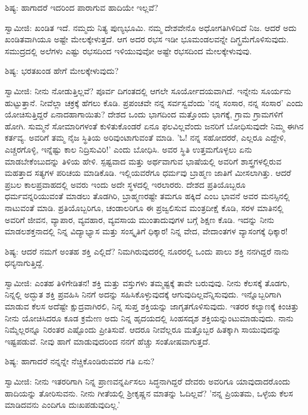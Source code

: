 ಶಿಷ್ಯ: ಹಾಗಾದರೆ ಇದರಿಂದ ಪಾರಾಗುವ ಹಾದಿಯೇ ಇಲ್ಲವೆ?

ಸ್ವಾಮೀಜಿ: ಖಂಡಿತ ಇದೆ. ನಮ್ಮದು ನಿತ್ಯ ಪುಣ್ಯಭೂಮಿ. ನಮ್ಮ ದೇಶವೇನೊ ಅಧೋಗತಿಗಿಳಿದಿದೆ ನಿಜ. ಆದರೆ ಅದು ಖಂಡಿತವಾಗಿಯೂ ಅಷ್ಟೇ ಮೇಲಕ್ಕೇಳುತ್ತದೆ. ಆಗ ಅದರ ರಭಸ ಇಡೀ ಭೂಮಂಡಲವನ್ನೇ ದಿಗ್ಭ್ರಮೆಗೊಳಿಸುವುದು. ಸಮುದ್ರದಲ್ಲಿ ಅಲೆಗಳು ಎಷ್ಟು ರಭಸದಿಂದ ಇಳಿಯುವುವೋ ಅಷ್ಟೇ ರಭಸದಿಂದ ಮೇಲಕ್ಕೇಳುವುವು.

ಶಿಷ್ಯ: ಭರತಖಂಡ ಹೇಗೆ ಮೇಲಕ್ಕೇಳುವುದು?

ಸ್ವಾಮೀಜಿ: ನೀನು ನೋಡುತ್ತಿಲ್ಲವೆ? ಪೂರ್ವ ದಿಗಂತದಲ್ಲಿ ಆಗಲೇ ಸೂರ್ಯೋದಯವಾಗಿದೆ. ಇನ್ನೇನು ಸೂರ್ಯನು ಹುಟ್ಟುತ್ತಾನೆ. ನೀವೆಲ್ಲಾ ಚಕ್ರಕ್ಕೆ ಹೆಗಲು ಕೊಡಿ. ಪ್ರಪಂಚವೇ ನನ್ನ ಸರ್ವಸ್ವವೆಂದು 'ನನ್ನ ಸಂಸಾರ, ನನ್ನ ಸಂಸಾರ' ಎಂದು ಯೋಚಿಸುತ್ತಿದ್ದರೆ ಏನಾದಹಾಗಾಯಿತು? ದೇಶದ ಒಂದು ಭಾಗದಿಂದ ಮತ್ತೊಂದು ಭಾಗಕ್ಕೆ, ಗ್ರಾಮ ಗ್ರಾಮಗಳಿಗೆ ಹೋಗಿ. ಸುಮ್ಮನೆ ಸೋಮಾರಿಗಳಂತೆ ಕುಳಿತುಕೊಂಡರೆ ಏನೂ ಫಲವಿಲ್ಲವೆಂದು ಜನರಿಗೆ ಬೋಧಿಸುವುದೇ ನಿಮ್ಮ ಈಗಿನ ಕರ್ತವ್ಯ. ಅವರಿಗೆ ತಮ್ಮ ನೈಜ ಸ್ಥಿತಿಯ ಅರಿವುಂಟಾಗುವಂತೆ ಮಾಡಿ. 'ಓ! ನನ್ನ ಸಹೋದರರೆ, ಎಲ್ಲರೂ ಎದ್ದೇಳಿ, ಎಚ್ಚರಗೊಳ್ಳಿ, ಇನ್ನೆಷ್ಟು ಕಾಲ ನಿದ್ರಿಸುವಿರಿ!' ಎಂದು ಬೋಧಿಸಿ. ಅವರ ಸ್ಥಿತಿ ಉತ್ತಮಗೊಳ್ಳಲು ಏನು ಮಾಡಬೇಕೆಂಬುದನ್ನು ತಿಳಿಯ ಹೇಳಿ. ಸ್ಪಷ್ಟವಾದ ಮತ್ತು ಅರ್ಥವಾಗುವ ಭಾಷೆಯಲ್ಲಿ ಅವರಿಗೆ ಶಾಸ್ತ್ರಗಳಲ್ಲಿರುವ ಮಹತ್ತಾದ ಸತ್ಯಗಳ ಪರಿಚಯ ಮಾಡಿಕೊಡಿ. ಇಲ್ಲಿಯವರೆಗೂ ಧರ್ಮವು ಬ್ರಾಹ್ಮಣ ಜಾತಿಗೆ ಮೀಸಲಾಗಿತ್ತು. ಆದರೆ ಪ್ರಬಲ ಕಾಲಪ್ರವಾಹದಲ್ಲಿ ಅವರು ಇಂದು ಅದೇ ಸ್ಥಳದಲ್ಲಿ ಇರಲಾರರು. ದೇಶದ ಪ್ರತಿಯೊಬ್ಬರೂ ಧರ್ಮವನ್ನರಿಯುವಂತೆ ಮಾಡಲು ತೊಡಗಿರಿ, ಬ್ರಾಹ್ಮಣರಷ್ಟೇ ತಮಗೂ ಹಕ್ಕಿದೆ ಎಂಬ ಭಾವನೆ ಅವರ ಮನಸ್ಸಿನಲ್ಲಿ ನಾಟುವಂತೆ ಮಾಡಿ. ಪ್ರತಿಯೊಬ್ಬರಿಗೂ, ಚಂಡಾಲರಿಗೂ ಈ ಪ್ರಜ್ವಲಿಸುವ ಮಂತ್ರದೀಕ್ಷೆ ಕೊಡಿ, ಸರಳ ಮಾತಿನಲ್ಲಿ ಅವರಿಗೆ ಜೀವನ, ವ್ಯಾಪಾರ, ವ್ಯವಹಾರ, ವ್ಯವಸಾಯ ಮುಂತಾದುವುಗಳ ಬಗ್ಗೆ ಶಿಕ್ಷಣ ಕೊಡಿ. ಇದನ್ನು ನೀನು ಮಾಡಲಶಕ್ತನಾದಲ್ಲಿ ನಿನ್ನ ವಿದ್ಯಾಭ್ಯಾಸ ಮತ್ತು ಸಂಸ್ಕೃತಿಗೆ ಧಿಕ್ಕಾರ! ನಿನ್ನ ವೇದ, ವೇದಾಂತಗಳ ವ್ಯಾಸಂಗಕ್ಕೆ ಧಿಕ್ಕಾರ!

ಶಿಷ್ಯ: ಆದರೆ ನಮಗೆ ಅಂತಹ ಶಕ್ತಿ ಎಲ್ಲಿದೆ? ನಿಮಗಿರುವುದರಲ್ಲಿ ನೂರರಲ್ಲಿ ಒಂದು ಪಾಲು ಶಕ್ತಿ ನನಗಿದ್ದರೆ ನಾನು ಧನ್ಯನಾಗುತ್ತಿದ್ದೆ.

ಸ್ವಾಮೀಜಿ: ಎಂತಹ ತಿಳಿಗೇಡಿತನ! ಶಕ್ತಿ ಮತ್ತು ವಸ್ತುಗಳು ತಮ್ಮಷ್ಟಕ್ಕೆ ತಾವೇ ಬರುವುವು. ನೀನು ಕೆಲಸಕ್ಕೆ ತೊಡಗು, ನಿನ್ನಲ್ಲಿ ಅದ್ಭುತ ಶಕ್ತಿ ಪ್ರವಹಿಸಿ ನಿನಗೆ ಅದನ್ನು ಸಹಿಸಿಕೊಳ್ಳುವುದಕ್ಕೆ ಆಗುವುದಿಲ್ಲವೆನ್ನಿಸುವುದು. ಇನ್ನೊಬ್ಬರಿಗಾಗಿ ಮಾಡುವ ಕೆಲಸ ಅದೆಷ್ಟೇ ಕ್ಷುದ್ರವಾಗಿರಲಿ, ನಿನ್ನ ಸುಪ್ತ ಶಕ್ತಿಯನ್ನು ಜಾಗೃತಗೊಳಿಸುವುದು. ಇತರರ ಕಲ್ಯಾಣಕ್ಕೆ ಕಿಂಚಿತ್ತು ನೀನು ಯೋಚಿಸಿದರೂ ಕೂಡ ಕ್ರಮೇಣ ಅದು ನಿನ್ನ ಹೃದಯದಲ್ಲಿ ಸಿಂಹಸದೃಶ ಶಕ್ತಿಯನ್ನುಂಟುಮಾಡುವುದು. ನಾನು ನಿಮ್ಮೆಲ್ಲರನ್ನೂ ನಿರಂತರ ಎಷ್ಟೊಂದು ಪ್ರೀತಿಸುವೆ. ಆದರೂ ನೀವೆಲ್ಲರೂ ಮತ್ತೊಬ್ಬರ ಹಿತಕ್ಕಾಗಿ ಸಾಯುವುದನ್ನು ಇಷ್ಟಪಡುವೆ. ನೀವು ಹಾಗೆ ಮಾಡುವುದರಿಂದ ನನಗೆ ಹೆಚ್ಚು ಸಂತೋಷವಾಗುತ್ತದೆ.

ಶಿಷ್ಯ: ಹಾಗಾದರೆ ನನ್ನನ್ನೇ ನೆಚ್ಚಿಕೊಂಡಿರುವವರ ಗತಿ ಏನು?

ಸ್ವಾಮೀಜಿ: ನೀನು ಇತರರಿಗಾಗಿ ನಿನ್ನ ಪ್ರಾಣವನ್ನರ್ಪಿಸಲು ಸಿದ್ಧನಾಗಿದ್ದರೆ ದೇವರು ಅವರಿಗೂ ಯಾವುದಾದರೊಂದು ಹಾದಿಯನ್ನು ತೋರಿಸುವನು. ನೀನು ಗೀತೆಯಲ್ಲಿ ಶ‍್ರೀಕೃಷ್ಣನ ಮಾತನ್ನು ಓದಿಲ್ಲವೆ? 'ನನ್ನ ಪ್ರಿಯತಮ, ಒಳ್ಳೆಯ ಕೆಲಸ ಮಾಡಿದವನು ಎಂದಿಗೂ ದುಃಖಪಡುವುದಿಲ್ಲ.'

